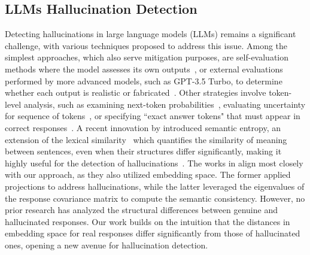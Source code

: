 \subsection{LLMs Hallucination Detection} \label{sub:detection}
Detecting hallucinations in large language models (LLMs) remains a significant challenge, with various techniques proposed to address this issue. Among the simplest approaches, which also serve mitigation purposes, are self-evaluation methods where the model assesses its own outputs~\cite{kadavath2022language, lin2022teaching, manakul2023selfcheckgpt}, or external evaluations performed by more advanced models, such as GPT-3.5 Turbo, to determine whether each output is realistic or fabricated~\cite{friel2023chainpoll}. 
Other strategies involve token-level analysis, such as examining next-token probabilities~\cite{varshney2023stitch}, evaluating uncertainty for sequence of tokens~\cite{malinin2021uncertainty}, or specifying 
``exact answer tokens" that must appear in correct responses~\cite{orgad2024llms}. A recent innovation by \citet{kuhn2023semantic} introduced semantic entropy, an extension of the lexical similarity~\cite{lin2022truthfulqa} which quantifies the similarity of meaning between sentences, even when their structures differ significantly, making it highly useful for the detection of hallucinations~\cite{farquhar2024detecting}.
The works in \citet{du2024haloscope,chen2024inside} align most closely with our approach, as they also utilized embedding space. The former applied projections to address hallucinations, while the latter leveraged the eigenvalues of the response covariance matrix to compute the semantic consistency. However, no prior research has analyzed the structural differences between genuine and hallucinated responses. Our work builds on the intuition that the distances in embedding space for real responses differ significantly from those of hallucinated ones, opening a new avenue for hallucination detection.